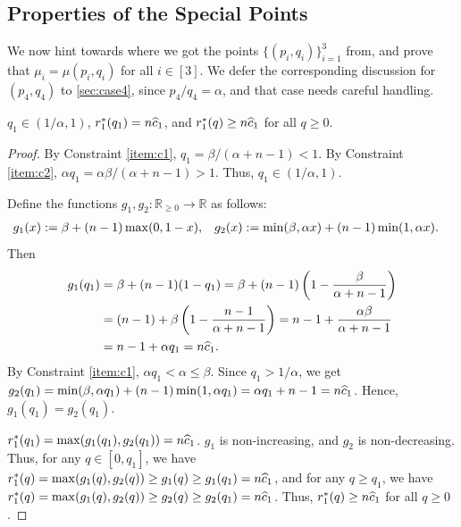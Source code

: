 \subsection{Properties of the Special Points}
\label{sec:sp-props}

We now hint towards where we got the points $\{(p_i, q_i)\}_{i=1}^3$ from,
and prove that $\mu_i = \mu(p_i, q_i)$ for all $i \in [3]$.
We defer the corresponding discussion for $(p_4, q_4)$ to \cref{sec:case4},
since $p_4/q_4 = \alpha$, and that case needs careful handling.

\begin{lemma}
\label{thm:q1}
$q_1 \in (1/\alpha, 1)$, $r_1^*(q_1) = n\widehat{c}_1$,
and $r_1^*(q) \ge n\widehat{c}_1$ for all $q \ge 0$.
\end{lemma}
\begin{proof}
By Constraint \ref{item:c1}, $q_1 = \beta/(\alpha + n-1) < 1$.
By Constraint \ref{item:c2}, $\alpha q_1 = \alpha\beta/(\alpha + n-1) > 1$.
Thus, $q_1 \in (1/\alpha, 1)$.

Define the functions $g_1, g_2: \mathbb{R}_{\ge 0} \to \mathbb{R}$ as follows:
\begin{align*}
g_1(x) &:= \beta + (n-1)\max(0, 1-x),
& g_2(x) &:= \min(\beta, \alpha x) + (n-1)\min(1, \alpha x).
\end{align*}
Then
\begin{align*}
g_1(q_1) &= \beta + (n-1)(1-q_1) = \beta + (n-1)\left(1 - \frac{\beta}{\alpha + n-1}\right)
\\ &= (n-1) + \beta\left(1 - \frac{n-1}{\alpha + n-1}\right)
    = n-1 + \frac{\alpha\beta}{\alpha + n-1}
\\ &= n-1 + \alpha q_1 = n\widehat{c}_1.
\end{align*}
By Constraint \ref{item:c1}, $\alpha q_1 < \alpha \le \beta$.
Since $q_1 > 1/\alpha$, we get
$g_2(q_1) = \min(\beta, \alpha q_1) + (n-1)\min(1, \alpha q_1) = \alpha q_1 + n-1 = n\widehat{c}_1$.
Hence, $g_1(q_1) = g_2(q_1)$.

$r_1^*(q_1) = \max(g_1(q_1), g_2(q_1)) = n\widehat{c}_1$.
$g_1$ is non-increasing, and $g_2$ is non-decreasing.
Thus, for any $q \in [0, q_1]$, we have
$r_1^*(q) = \max(g_1(q), g_2(q)) \ge g_1(q) \ge g_1(q_1) = n\widehat{c}_1$,
and for any $q \ge q_1$, we have
$r_1^*(q) = \max(g_1(q), g_2(q)) \ge g_2(q) \ge g_2(q_1) = n\widehat{c}_1$.
Thus, $r_1^*(q) \ge n\widehat{c}_1$ for all $q \ge 0$.
\end{proof}

